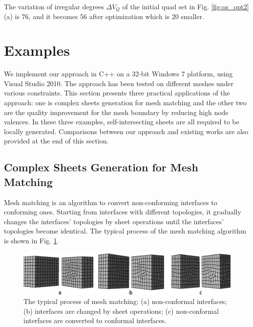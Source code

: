 \documentclass[final,5p,times,twocolumn]{elsarticle}
\begin{document}
The variation of irregular degrees $\Delta V_Q$ of the initial quad set in Fig. \ref{fig:qs_opt2}(a) is 76, and it becomes 56 after optimization which is 20 smaller.

\section{Examples}
\label{sec:examples}
We implement our approach in C++ on a 32-bit Windows 7 platform, using Visual Studio 2010. The approach has been tested on different meshes under various constraints. This section presents three practical applications of the approach: one is complex sheets generation for mesh matching and the other two are the quality improvement for the mesh boundary by reducing high node valences. In these three examples, self-intersecting sheets are all required to be locally generated. Comparisons between our approach and existing works are also provided at the end of this section.

\subsection{Complex Sheets Generation for Mesh Matching}
\label{sec:mesh_matching}
Mesh matching is an algorithm to convert non-conforming interfaces to conforming ones\cite{Chen:2015kf,Staten2010d}. Starting from interfaces with different topologies, it gradually changes the interfaces' topologies by sheet operations until the interfaces' topologies become identical. The typical process of the mesh matching algorithm is shown in Fig. \ref{fig:mesh_matching_exam}.

\begin{figure}[htbp]
\begin{center}
\includegraphics[width=16.5cm]{rev_figures/mesh_matching.png}
\caption{The typical process of mesh matching: (a) non-conformal interfaces; (b) interfaces are changed by sheet operations; (c) non-conformal interfaces are converted to conformal interfaces.}
\label{fig:mesh_matching_exam}
\end{center}
\end{figure}
\end{document}
